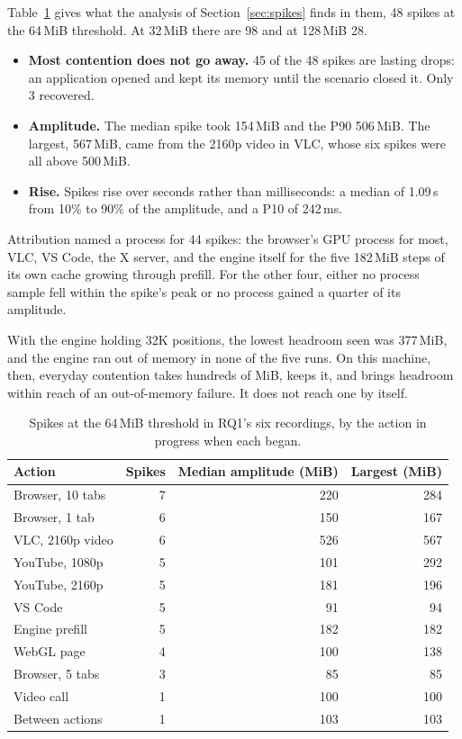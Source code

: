 \documentclass[11pt]{article}
\begin{document}
Table~\ref{tab:rq1} gives what the analysis of Section~\ref{sec:spikes} finds in
them, 48 spikes at the 64\,MiB threshold. At 32\,MiB there are 98 and at
128\,MiB 28.
\begin{itemize}
\item \textbf{Most contention does not go away.} 45 of the 48 spikes are
lasting drops: an application opened and kept its memory until the scenario
closed it. Only 3 recovered.
\item \textbf{Amplitude.} The median spike took 154\,MiB and the P90
506\,MiB. The largest, 567\,MiB, came from the 2160p video in VLC, whose six
spikes were all above 500\,MiB.
\item \textbf{Rise.} Spikes rise over seconds rather than milliseconds: a median
of 1.09\,s from 10\% to 90\% of the amplitude, and a P10 of 242\,ms.
\end{itemize}
Attribution named a process for 44 spikes: the browser's GPU process for most,
VLC, VS Code, the X server, and the engine itself for the five 182\,MiB steps of
its own cache growing through prefill. For the other four, either no process
sample fell within the spike's peak or no process gained a quarter of its
amplitude.

With the engine holding 32K positions, the lowest headroom seen was 377\,MiB,
and the engine ran out of memory in none of the five runs. On this machine,
then, everyday contention takes hundreds of MiB, keeps it, and brings headroom
within reach of an out-of-memory failure. It does not reach one by itself.

\begin{table}[ht]
\centering
\small
\begin{tabular}{lrrr}
\toprule
Action & Spikes & Median amplitude (MiB) & Largest (MiB) \\
\midrule
Browser, 10 tabs & 7 & 220 & 284 \\
Browser, 1 tab & 6 & 150 & 167 \\
VLC, 2160p video & 6 & 526 & 567 \\
YouTube, 1080p & 5 & 101 & 292 \\
YouTube, 2160p & 5 & 181 & 196 \\
VS Code & 5 & 91 & 94 \\
Engine prefill & 5 & 182 & 182 \\
WebGL page & 4 & 100 & 138 \\
Browser, 5 tabs & 3 & 85 & 85 \\
Video call & 1 & 100 & 100 \\
Between actions & 1 & 103 & 103 \\
\bottomrule
\end{tabular}
\caption{Spikes at the 64\,MiB threshold in RQ1's six recordings, by the action
in progress when each began.}
\label{tab:rq1}
\end{table}
\end{document}
